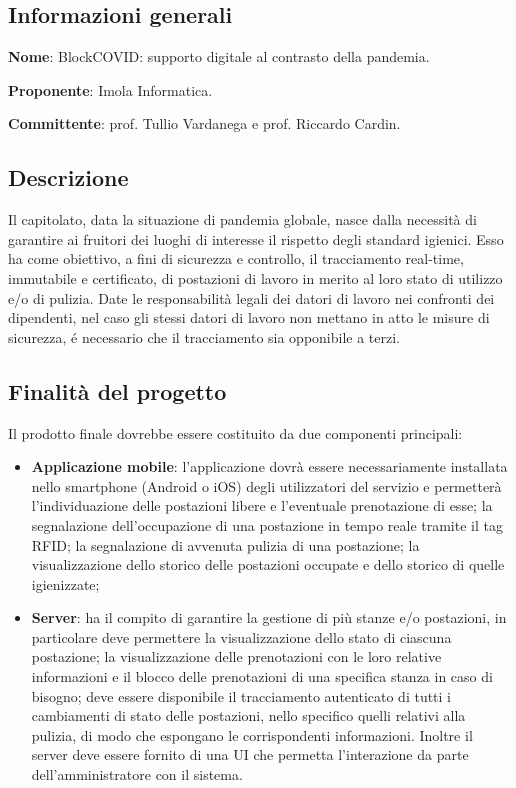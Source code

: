 \documentclass[../studio-di-fattibilita.tex]{subfiles}
\begin{document}
\subsection{Informazioni generali}%
\label{sub:informazioni_generale}
\begin{description}
  \item \textbf{Nome}: BlockCOVID: supporto digitale al contrasto della pandemia.
  \item \textbf{Proponente}: Imola Informatica.
  \item \textbf{Committente}: prof. Tullio Vardanega e prof. Riccardo Cardin.
\end{description}

\subsection{Descrizione}%
\label{sub:descrizione}
Il capitolato, data la situazione di pandemia globale, nasce dalla necessità di garantire ai fruitori dei luoghi di interesse il rispetto degli standard igienici. Esso ha come obiettivo, a fini di sicurezza e controllo, il tracciamento real-time, immutabile e certificato, di postazioni di lavoro in merito al loro stato di utilizzo e/o di pulizia. Date le responsabilità legali dei datori di lavoro nei confronti dei dipendenti, nel caso gli stessi datori di lavoro non mettano in atto le misure di sicurezza, é necessario che il tracciamento sia opponibile a terzi.


\subsection{Finalità del progetto}%
\label{sub:finalita_del_progetto}
Il prodotto finale dovrebbe essere costituito da due componenti principali: 
\begin{itemize}
  \item \textbf{Applicazione mobile}: l’applicazione dovrà essere necessariamente installata nello smartphone (Android o iOS) degli utilizzatori del servizio e permetterà l’individuazione delle postazioni libere e l’eventuale prenotazione di esse; la segnalazione dell’occupazione di una postazione in tempo reale tramite il tag RFID; la segnalazione di avvenuta pulizia di una postazione; la visualizzazione dello storico delle postazioni occupate e dello storico di quelle igienizzate;
  \item \textbf{Server}: ha il compito di garantire la gestione di più stanze e/o postazioni, in particolare deve permettere la visualizzazione dello stato di ciascuna postazione; la visualizzazione delle prenotazioni con le loro relative informazioni e il blocco delle prenotazioni di una specifica stanza in caso di bisogno; deve essere disponibile il tracciamento autenticato di tutti i cambiamenti di stato delle postazioni, nello specifico quelli relativi alla pulizia, di modo che espongano le corrispondenti informazioni. Inoltre il server deve essere fornito di una UI che permetta l’interazione da parte dell’amministratore con il sistema.
\end{itemize}
\end{document}
